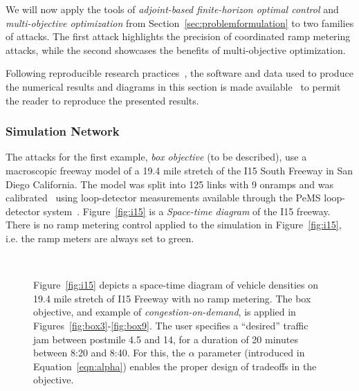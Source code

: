 We will now apply the tools of \emph{adjoint-based finite-horizon optimal control} and \emph{multi-objective optimization} from Section~\ref{sec:problemformulation} to two families of attacks. The first attack highlights the precision of coordinated ramp metering attacks, while the second showcases the benefits of multi-objective optimization.

Following reproducible research practices~\cite{donoho2009reproducible,stodden2009enabling}, the software and data used to produce the numerical results and diagrams in this section is made available~\cite{smartroadswebsite} to permit the reader to reproduce the presented results.

\subsubsection{Simulation Network}

The attacks for the first example, \emph{box objective} (to be described), use a macroscopic freeway model of a 19.4 mile stretch of the I15 South Freeway in San Diego California. The model was split into 125 links with 9 onramps and was calibrated~\cite{dervisoglu2014macroscopic,Muralidharan2009c} using loop-detector measurements available through the PeMS loop-detector system~\cite{jia2001pems}. Figure~\ref{fig:i15} is a \emph{Space-time diagram} of the I15 freeway. There is no ramp metering control applied to the simulation in Figure~\ref{fig:i15}, i.e. the ramp meters are always set to green.

\begin{figure}
\centering
{}\\
\hfill
{}\hfill
{}%
\caption{Figure~\ref{fig:i15} depicts a space-time diagram of vehicle densities on 19.4 mile stretch of I15 Freeway with no ramp metering. The box objective, and example of \emph{congestion-on-demand}, is applied in Figures~\ref{fig:box3}-\ref{fig:box9}. The user specifies a ``desired'' traffic jam between postmile 4.5 and 14, for a duration of 20 minutes between 8:20 and 8:40. For this, the $\alpha$ parameter (introduced in Equation~\eqref{eqn:alpha}) enables the proper design of tradeoffs in the objective.}
\end{figure}


